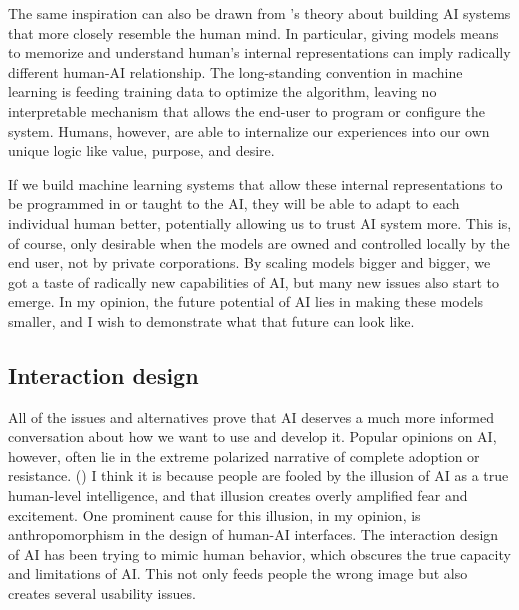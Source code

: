 \documentclass[12pt]{article}
\begin{document}
The same inspiration can also be drawn from \cite{reboot}'s theory about building AI systems that more closely resemble the human mind. In particular, giving models means to memorize and understand human's internal representations can imply radically different human-AI relationship. The long-standing convention in machine learning is feeding training data to optimize the algorithm, leaving no interpretable mechanism that allows the end-user to program or configure the system. Humans, however, are able to internalize our experiences into our own unique logic like value, purpose, and desire.

If we build machine learning systems that allow these internal representations to be programmed in or taught to the AI, they will be able to adapt to each individual human better, potentially allowing us to trust AI system more. This is, of course, only desirable when the models are owned and controlled locally by the end user, not by private corporations. By scaling models bigger and bigger, we got a taste of radically new capabilities of AI, but many new issues also start to emerge. In my opinion, the future potential of AI lies in making these models smaller, and I wish to demonstrate what that future can look like.
\subsection{Interaction design}
All of the issues and alternatives prove that AI deserves a much more informed conversation about how we want to use and develop it. Popular opinions on AI, however, often lie in the extreme polarized narrative of complete adoption or resistance. (\cite{resistance, adoption}) I think it is because people are fooled by the illusion of AI as a true human-level intelligence, and that illusion creates overly amplified fear and excitement. One prominent cause for this illusion, in my opinion, is anthropomorphism in the design of human-AI interfaces. The interaction design of AI has been trying to mimic human behavior, which obscures the true capacity and limitations of AI. This not only feeds people the wrong image but also creates several usability issues.
\end{document}
